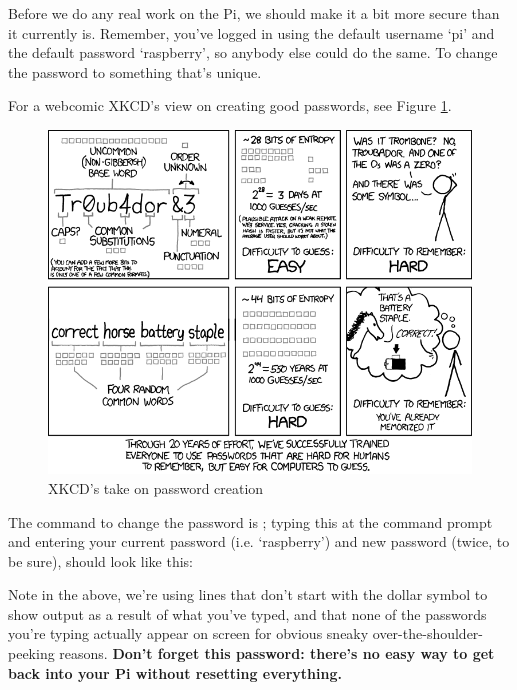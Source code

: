 Before we do any real work on the Pi, we should make it a bit more secure than it currently is. Remember, you've logged in using the default username `pi' and the default password `raspberry', so anybody else could do the same. To change the password to something that's unique. 

For a webcomic XKCD's view on creating good passwords, see Figure \ref{figure:xkcd-password}.

\begin{figure}
\centerline{\includegraphics[width=13.5cm]{images/xkcd-password-strength}}
\caption{XKCD's take on password creation }\label{figure:xkcd-password}
\end{figure}

The command to change the password is ; typing this at the command prompt and entering your current password (i.e. `raspberry') and new password (twice, to be sure), should look like this:



\noindent Note in the above, we're using lines that don't start with the dollar symbol to show output as a result of what you've typed, and that none of the passwords you're typing actually appear on screen for obvious sneaky over-the-shoulder-peeking reasons. \textbf{Don't forget this password: there's no easy way to get back into your Pi without resetting everything.}

